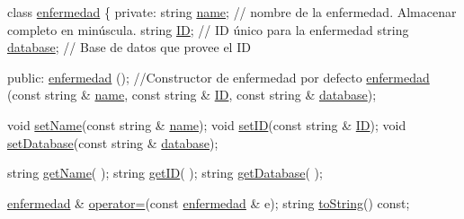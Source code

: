 \begin{DoxyCode}
\textcolor{keyword}{class }\hyperlink{classenfermedad}{enfermedad} \{
\textcolor{keyword}{private}:
  \textcolor{keywordtype}{string}  \hyperlink{classenfermedad_ad7c4204057028a73bde6022678c6813e}{name};       \textcolor{comment}{// nombre de la enfermedad. Almacenar completo en minúscula. }
  \textcolor{keywordtype}{string}  \hyperlink{classenfermedad_a689cdbd469ecc28e045bda2f62a229d2}{ID};         \textcolor{comment}{// ID único para la enfermedad}
  \textcolor{keywordtype}{string}  \hyperlink{classenfermedad_a3684b7ec850d4c9357dd21bdd5e02803}{database};   \textcolor{comment}{// Base de datos que provee el ID}

\textcolor{keyword}{public}:
 \hyperlink{classenfermedad_a60eb5e620b0bf9a53d4f0980031aeefd}{enfermedad} (); \textcolor{comment}{//Constructor de enfermedad por defecto}
 \hyperlink{classenfermedad_a60eb5e620b0bf9a53d4f0980031aeefd}{enfermedad} (\textcolor{keyword}{const} \textcolor{keywordtype}{string} & \hyperlink{classenfermedad_ad7c4204057028a73bde6022678c6813e}{name}, \textcolor{keyword}{const} \textcolor{keywordtype}{string} & \hyperlink{classenfermedad_a689cdbd469ecc28e045bda2f62a229d2}{ID}, \textcolor{keyword}{const} \textcolor{keywordtype}{string} & 
      \hyperlink{classenfermedad_a3684b7ec850d4c9357dd21bdd5e02803}{database}); 

 \textcolor{keywordtype}{void} \hyperlink{classenfermedad_a18f621d13de01c0b06a05757ddd8a087}{setName}(\textcolor{keyword}{const} \textcolor{keywordtype}{string} & \hyperlink{classenfermedad_ad7c4204057028a73bde6022678c6813e}{name});
 \textcolor{keywordtype}{void} \hyperlink{classenfermedad_a5ad52bdce8de9ac4fe25b460dc699af4}{setID}(\textcolor{keyword}{const} \textcolor{keywordtype}{string} & \hyperlink{classenfermedad_a689cdbd469ecc28e045bda2f62a229d2}{ID});
 \textcolor{keywordtype}{void} \hyperlink{classenfermedad_ac1f009307d52232420a72264e9c2ce3f}{setDatabase}(\textcolor{keyword}{const} \textcolor{keywordtype}{string} & \hyperlink{classenfermedad_a3684b7ec850d4c9357dd21bdd5e02803}{database});

 \textcolor{keywordtype}{string} \hyperlink{classenfermedad_ab22f6f0140a5fe5a331d72920d95f55b}{getName}( );
 \textcolor{keywordtype}{string} \hyperlink{classenfermedad_aaf9b9135b1d4efda7dc61856fce1b7b2}{getID}( );
 \textcolor{keywordtype}{string} \hyperlink{classenfermedad_a79d304a2e39ea391917744fd4d8f168d}{getDatabase}( );
 
 \hyperlink{classenfermedad}{enfermedad} & \hyperlink{classenfermedad_a795be16b7e3e6a858211ff20a62c9d85}{operator=}(\textcolor{keyword}{const} \hyperlink{classenfermedad}{enfermedad} & e);
 \textcolor{keywordtype}{string} \hyperlink{classenfermedad_a044425928b4f7fa6a398cf2486260b23}{toString}() \textcolor{keyword}{const};


\end{DoxyCode}
